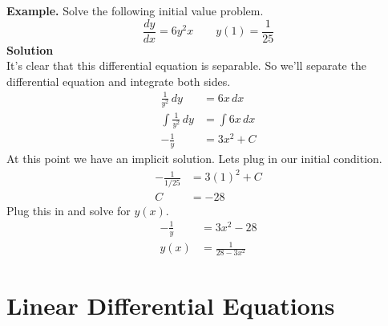 \documentclass[10pt,reqno]{book}
\theoremstyle{definition}
\begin{document}
	\noindent \textbf{Example.} Solve the following initial value problem.
	\[ \frac{dy}{dx} = 6y^2x \qquad y(1) = \frac{1}{25} \]
	\textbf{Solution}\\
	It's clear that this differential equation is separable. So we'll separate the differential equation and integrate both sides.
	\begin{align*}
		\frac{1}{y^2}\,dy &= 6x\,dx\\
		\int\frac{1}{y^2}\,dy &= \int 6x\,dx\\
		-\frac{1}{y} &= 3x^2 + C
	\end{align*}
	At this point we have an implicit solution. Lets plug in our initial condition.
	\begin{align*}
	 -\frac{1}{1/25} &= 3(1)^2 + C\\
	 C &= -28
	\end{align*}
	Plug this in and solve for $ y(x) $.
	\begin{align*}
		-\frac{1}{y} &= 3x^2 - 28\\
		y(x) &= \frac{1}{28 - 3x^2}
	\end{align*}

	\section{Linear Differential Equations}
\end{document}
